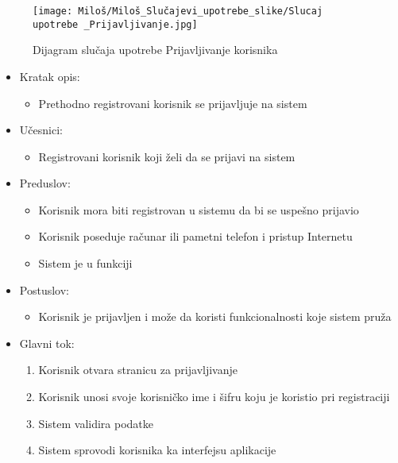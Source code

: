 \documentclass[a4paper]{article}
\begin{document}
\begin{figure}[htp]
    \centering
    \texttt{[image: Miloš/Miloš\_Slučajevi\_upotrebe\_slike/Slucaj upotrebe \_Prijavljivanje.jpg]}
    \caption{Dijagram slučaja upotrebe Prijavljivanje korisnika}
    \label{fig:Prijavljivanje}
\end{figure}

\begin{itemize}
    \item Kratak opis:
        \begin{itemize}
            \item Prethodno registrovani korisnik se prijavljuje na sistem
        \end{itemize}
    \item Učesnici:
        \begin{itemize}
            \item Registrovani korisnik koji želi da se prijavi na sistem
        \end{itemize}
    \item Preduslov:
        \begin{itemize}
            \item Korisnik mora biti registrovan u sistemu da bi se uspešno prijavio
            \item Korisnik poseduje računar ili pametni telefon i pristup Internetu
            \item Sistem je u funkciji
        \end{itemize}
    \item Postuslov:
        \begin{itemize}
            \item Korisnik je prijavljen i može da koristi funkcionalnosti koje sistem pruža
        \end{itemize}
    \item Glavni tok:
        \begin{enumerate}
            \item Korisnik otvara stranicu za prijavljivanje
            \item Korisnik unosi svoje korisničko ime i šifru koju je koristio pri registraciji
            \item Sistem validira podatke
            \item Sistem sprovodi korisnika ka interfejsu aplikacije

\end{enumerate}
\end{itemize}
\end{document}
